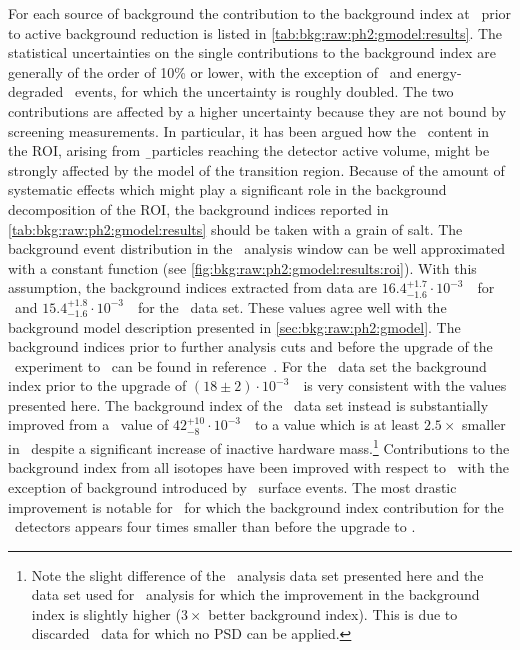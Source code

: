 For each source of background the contribution to the background index at \qbb\ prior to
active background reduction is listed in \cref{tab:bkg:raw:ph2:gmodel:results}. The
statistical uncertainties on the single contributions to the background index are
generally of the order of 10\% or lower, with the exception of \kvz\ and energy-degraded
\a\ events, for which the uncertainty is roughly doubled. The two contributions are
affected by a higher uncertainty because they are not bound by screening measurements. In
particular, it has been argued how the \kvz\ content in the ROI, arising from \b\
particles reaching the detector active volume, might be strongly affected by the model of
the transition region. Because of the amount of systematic effects which might play a
significant role in the background decomposition of the ROI, the background indices
reported in \cref{tab:bkg:raw:ph2:gmodel:results} should be taken with a grain of salt.
\newpar
The background event distribution in the \onbb\ analysis window can be well approximated
with a constant function (see \cref{fig:bkg:raw:ph2:gmodel:results:roi}).  With this
assumption, the background indices extracted from data are $16.4^{+1.7}_{-1.6} \cdot
10^{-3}$~\ctsper\ for \enrBEGeII\ and $15.4^{+1.8}_{-1.6} \cdot 10^{-3}$~\ctsper\ for the
\enrCoaxII\ data set.  These values agree well with the background model description
presented in \cref{sec:bkg:raw:ph2:gmodel}. The background indices prior to further
analysis cuts and before the upgrade of the \gerda\ experiment to \phasetwo\ can be found
in reference~\cite{Agostini2013c}. For the \enrCoaxII\ data set the background index prior
to the upgrade of $(18 \pm 2) \cdot 10^{-3}$~\ctsper\ is very consistent with the values
presented here.  The background index of the \enrBEGeII\ data set instead is substantially
improved from a \phaseone\ value of $42^{+10}_{-8} \cdot 10^{-3}$~\ctsper\ to a value
which is at least $2.5\times$ smaller in \phasetwo\ despite a significant increase of
inactive hardware mass.\footnote{%
  Note the slight difference of the \enrBEGeII\ analysis data set presented here and the
  data set used for \onbb\ analysis for which the improvement in the background index is
  slightly higher ($3\times$ better background index). This is due to discarded \bege\
  data for which no PSD can be applied.
} Contributions to the background index from all isotopes have been improved with
respect to \phaseone\ with the exception of background introduced by \a\ surface events.
The most drastic improvement is notable for \kvz\ for which the background index
contribution for the \bege\ detectors appears four times smaller than before the upgrade
to \phasetwo.

